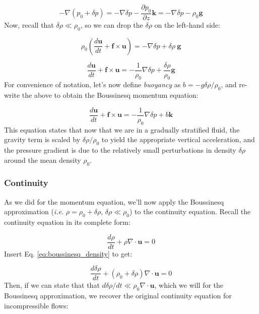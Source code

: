 \documentclass[12pt]{article}
\numberwithin{equation}{section}
\numberwithin{figure}{section}
\numberwithin{table}{section}
\begin{document}
\begin{equation}
  - \nabla \left( p_0 + \delta p \right) =
  - \nabla \delta p - \frac{\partial p_0}{\partial z} \mathbf{k} = 
  - \nabla \delta p - \rho_0 \mathbf{g}
\end{equation}
Now, recall that $\delta \rho \ll \rho_0$, so we can drop the $\delta \rho$
on the left-hand side:

\begin{equation}
  \rho_0 \left( \frac{d \mathbf{u}}{dt} + \mathbf{f} \times \mathbf{u} \right) =
  - \nabla \delta p + \delta \rho\ \mathbf{g}
\end{equation}

\begin{equation}
  \frac{d \mathbf{u}}{dt} + \mathbf{f} \times \mathbf{u} =
  - \frac{1}{\rho_0} \nabla \delta p + \frac{\delta \rho}{\rho_0} \mathbf{g}
\end{equation}
For convenience of notation, let's now define \textit{buoyancy}
as $b = - g \delta \rho / \rho_0$, and re-write the above to obtain the
Boussinesq momentum equation:

\begin{equation}
  \frac{d \mathbf{u}}{dt} + \mathbf{f} \times \mathbf{u} =
  - \frac{1}{\rho_0} \nabla \delta p + b \mathbf{k}
\end{equation}
This equation states that now that we are in a gradually stratified fluid,
the gravity term is scaled by $\delta \rho / \rho_0$ to yield the appropriate
vertical acceleration, and the pressure gradient is due to the relatively
small perturbations in density $\delta \rho$ around  the mean density $\rho_0$.

\subsubsection{Continuity}

As we did for the momentum equation, we'll now apply the Boussinesq approximation
(\textit{i.e.} $\rho = \rho_0 + \delta \rho$, $\delta \rho \ll \rho_0$) to the
continuity equation.
Recall the continuity equation in its complete form:

\begin{equation}
  \frac{d \rho}{dt} + \rho \nabla \cdot \mathbf{u} = 0
\end{equation}
Insert Eq. \ref{eq:boussinesq_density} to get:

\begin{equation}
  \frac{d\delta \rho}{dt} + \left( \rho_0 + \delta \rho \right) \nabla \cdot \mathbf{u} = 0
\end{equation}
Then, if we can state that that $d\delta \rho / dt \ll \rho_0 \nabla \cdot \mathbf{u}$,
which we will for the Boussinesq approximation, we recover the original
continuity equation for incompressible flows:
\end{document}
